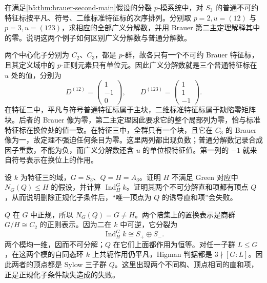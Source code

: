 \begin{optionalexercise}\label{b5:ex:08-generalized-decomposition-s3}
	在满足\cref{b5:thm:brauer-second-main}假设的分裂 \(p\)-模系统中，对 \(S_3\) 的普通不可约特征标按平凡、符号、二维标准特征标的次序排列。分别取 \(p=2,u=(12)\) 与 \(p=3,u=(123)\)，求相应的全部广义分解数，并用 Brauer 第二主定理解释其中的零。说明这两个例子如何区别广义分解数与普通分解数。
\end{optionalexercise}
\begin{solution}
	两个中心化子分别为 \(C_2\)、\(C_3\)，都是 \(p\)-群，故各只有一个不可约 Brauer 特征标，且其定义域中的 \(p\)-正则元素只有单位元。因此广义分解数就是三个普通特征标在 \(u\) 处的值，分别为
	\[
		D^{(12)}=\begin{pmatrix}1\\-1\\0\end{pmatrix},\qquad
		D^{(123)}=\begin{pmatrix}1\\1\\-1\end{pmatrix}.
	\]
	在特征二中，平凡与符号普通特征标属于主块，二维标准特征标属于缺陷零矩阵块。后者的 Brauer 像为零，第二主定理因此要求它的整个局部列为零，恰与标准特征标在换位处的值一致。在特征三中，全群只有一个块，且它在 \(C_3\) 的 Brauer 像为一，故定理不强迫任何条目为零。这里两列都出现负数；普通分解数记录合成因子重数，不能为负，而广义分解数还含 \(u\) 的单位根特征值。第一列的 \(-1\) 就来自符号表示在换位上的作用。
\end{solution}

\begin{optionalexercise}\label{b5:ex:08-green-normalizer-condition}
	设 \(k\) 为特征三的域，\(G=S_3\)、\(Q=H=A_3\)。证明 \(H\) 不满足 Green 对应中 \(N_G(Q)\le H\) 的假设，并计算 \(\operatorname{Ind}_H^Gk\)。证明其两个不可分解直和项都有顶点 \(Q\)，从而说明删除正规化子条件后，“唯一顶点为 \(Q\) 的诱导直和项”会失败。
\end{optionalexercise}
\begin{solution}
	\(Q\) 在 \(G\) 中正规，所以 \(N_G(Q)=G\ne H\)。两个陪集上的置换表示是商群 \(G/H\cong C_2\) 的正则表示。因为二在 \(k\) 中可逆，它分裂为
	\[
		\operatorname{Ind}_H^Gk\cong S_+\oplus S_-.
	\]
	两个模均一维，因而不可分解；\(Q\) 在它们上面都作用为恒等。对任一子群 \(L\le G\)，在这两个模的自同态环 \(k\) 上共轭作用仍平凡，Higman 判据都是 \(3\nmid[G:L]\)。因此两者的顶点都是 Sylow 三子群 \(Q\)。这里出现两个不同构、顶点相同的直和项，正是正规化子条件缺失造成的失败。
\end{solution}

